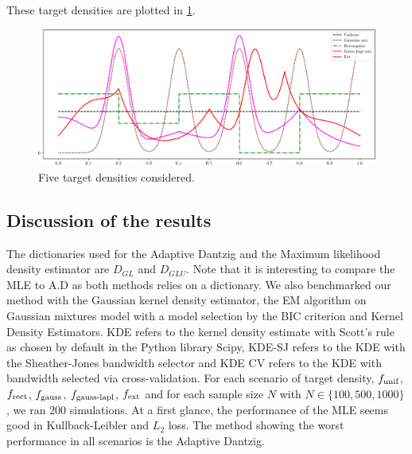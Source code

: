 These target densities are plotted in \cref{fig:target_densities}.
\begin{figure}[h]
\center
\includegraphics[width=1.1\textwidth]{TeX_files/densities_f_star.png}
\caption{Five target densities considered.}
\label{fig:target_densities}
\end{figure}

\subsection{Discussion of the results}
The dictionaries used for the Adaptive Dantzig and the Maximum likelihood density estimator are $D_{GL}$ and $D_{GLU}$. Note that it is interesting to compare the MLE to A.D as both methods relies on a dictionary. We also benchmarked our method with the Gaussian kernel density estimator, the EM algorithm on Gaussian mixtures model with a model selection by the BIC criterion and Kernel Density Estimators. KDE refers to the kernel density estimate with Scott's rule as chosen by default in the Python library Scipy, KDE-SJ refers to the KDE with the Sheather-Jones bandwidth selector and KDE CV refers to the KDE with bandwidth selected via cross-validation. For each scenario of target density, $f_{\textnormal{unif}}$, $f_{\textnormal{rect}}$, $f_{\textnormal{gauss}}$, $f_{\textnormal{gauss-lapl}}$, $f_{\textnormal{ext}}$ and for each sample size $N$  with $N\in\{100, 500, 1000\}$, we ran 200 simulations. At a first glance, the performance of the MLE seems good in Kullback-Leibler and $L_2$ loss. The method showing the worst performance in all scenarios is the Adaptive Dantzig.

